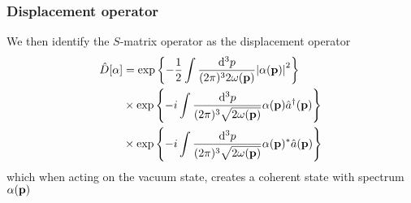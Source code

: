 \subsubsection{Displacement operator}

We then identify the $S$-matrix operator as the displacement operator
\begin{equation}
	\begin{split}
		\hat{D}[\alpha]
		&=
		\exp\left\{
			-
			\frac{1}{2}
			\int\frac{\dd[3]{p}}{(2\pi)^32\omega(\vb{p})}
			\abs{\alpha(\vb{p})}^2
		\right\}
		\\
		&\times
		\exp\left\{
			-i
			\int\frac{\dd[3]{p}}{(2\pi)^3\sqrt{2\omega(\vb{p})}}
			\alpha(\vb{p})
			\hat{a}^\dagger(\vb{p})
		\right\}
		\\
		&\times
		\exp\left\{
			-i
			\int\frac{\dd[3]{p}}{(2\pi)^3\sqrt{2\omega(\vb{p})}}
			\alpha(\vb{p})^*
			\hat{a}(\vb{p})
		\right\}
	\end{split}
\end{equation}
which when acting on the vacuum state, creates a coherent state with spectrum $\alpha(\vb{p})$
